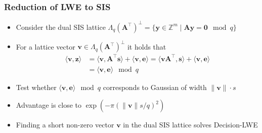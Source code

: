 \documentclass[t, aspectratio=169]{beamer}
\begin{document}
\begin{frame}
    \frametitle{Reduction of LWE to SIS}
    \begin{itemize}[<+->]
        \item Consider the dual SIS lattice $\Lambda_q(\mathbf{A}^\intercal)^{\perp} = \{ \mathbf{y} \in \mathbb{Z}^m \mid \mathbf{A} \mathbf{y} = \mathbf{0} \mod q\}$
        \item For a lattice vector $\mathbf{v} \in \Lambda_q(\mathbf{A}^\intercal)^{\perp}$ it holds that
              \begin{align*}
                  \langle \mathbf{v}, \mathbf{z} \rangle & = \langle \mathbf{v}, \mathbf{A}^\intercal \mathbf{s} \rangle + \langle \mathbf{v}, \mathbf{e}\rangle = \langle \mathbf{v}\mathbf{A}^\intercal,  \mathbf{s} \rangle + \langle \mathbf{v}, \mathbf{e} \rangle \\
                                                         & = \langle \mathbf{v}, \mathbf{e} \rangle \mod q
              \end{align*}
        \item Test whether $\langle \mathbf{v}, \mathbf{e} \rangle \mod q$ corresponds to Gaussian of width $\|\mathbf{v}\| \cdot s$ %
        \item Advantage is close to $\exp(-\pi (\| \mathbf{v} \| s/q)^2)$
        \item Finding a short non-zero vector $\mathbf{v}$ in the dual SIS lattice solves Decision-LWE
    \end{itemize} %
\end{frame}
\end{document}
